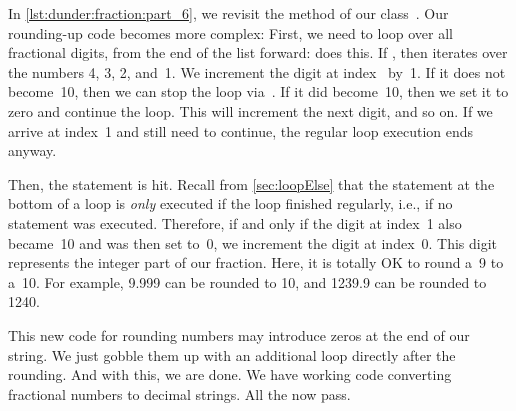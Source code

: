 In \cref{lst:dunder:fraction:part_6}, we revisit the  method of our class~.
Our rounding-up code becomes more complex:
First, we need to loop over all fractional digits, from the end of the list  forward:
 does this.
If , then  iterates over the numbers 4, 3, 2, and~1.
We increment the digit at index~ by~1.
If it does not become~10, then we can stop the loop via~.
If it did become~10, then we set it to zero and continue the loop.
This will increment the next digit, and so on.
If we arrive at index~1 and still need to continue, the regular loop execution ends anyway.

Then, the  statement is hit.
Recall from \cref{sec:loopElse} that the  statement at the bottom of a loop is \emph{only} executed if the loop finished regularly, i.e., if no  statement was executed.
Therefore, if and only if the digit at index~1 also became~10 and was then set to~0, we increment the digit at index~0.
This digit represents the integer part of our fraction.
Here, it is totally OK to round a~9 to a~10.
For example, 9.999 can be rounded to 10, and 1239.9 can be rounded to 1240.

This new code for rounding numbers may introduce zeros at the end of our string.
We just gobble them up with an additional  loop directly after the rounding.
And with this, we are done.
We have working code converting fractional numbers to decimal strings.
All the  now pass.

%
%
%
%

